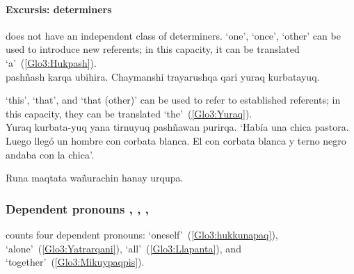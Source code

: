 \paragraph{Excursis: determiners}
\SYQ{} does not have an independent class of determiners.  ‘one’, ‘once’, ‘other’ can be used to introduce new referents; in this capacity, it can be translated ‘a’~(\ref{Glo3:Hukpash}).\\

%
{ pashñash karqa ubihira. Chaymanshi trayarushqa  qari yuraq kurbatayuq.}%
{}%
{}{}%

\noindent
{} ‘this’,  ‘that’, and  ‘that (other)’ can be used to refer to established referents; in this capacity, they can be translated ‘the’~(\ref{Glo3:Yuraq}).\\

%
{Yuraq kurbata-yuq yana tirnuyuq  pashñawan purirqa.}%
{}%
%
{‘Había una chica pastora. Luego llegó un hombre con corbata blanca. El con corbata blanca y terno negro andaba con la chica’.}%
{}{}%

%
{Runa  maqtata wañurachin hanay urqupa.}%
{}%
{}{}%

\subsubsection{Dependent pronouns , , , }\label{ssec:deppro}
\SYQ{} counts four dependent pronouns:  ‘oneself’~(\ref{Glo3:hukkunapaq}),  ‘alone’~(\ref{Glo3:Yatrarqani}),  ‘all’~(\ref{Glo3:Llapanta}), and  ‘together’~(\ref{Glo3:Mikuypaqpis}).\\

